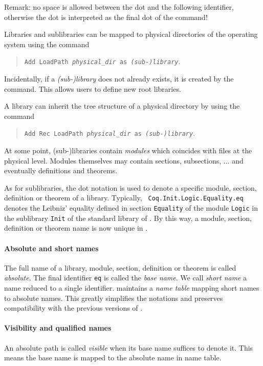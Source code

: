 \documentclass[11pt]{article}
\begin{document}
\smallskip
Remark: no space is allowed
between the dot and the following identifier, otherwise the dot is
interpreted as the final dot of the command!
\smallskip

Libraries and sublibraries can be mapped to physical directories of the
operating system using the command

\begin{quote}
{\tt Add LoadPath {\it physical\_dir} as {\it (sub-)library}}.
\end{quote}

Incidentally, if a {\it (sub-)library} does not already
exists, it is created by the command. This allows users to define new
root libraries.

A library can inherit the tree structure of a physical directory by
using the command

\begin{quote}
{\tt Add Rec LoadPath {\it physical\_dir} as {\it (sub-)library}}.
\end{quote}

At some point, (sub-)libraries contain {\it modules} which coincides
with files at the physical level. Modules themselves may contain
sections, subsections, ... and eventually definitions and theorems.

As for sublibraries, the dot notation is used to denote a specific
module, section, definition or theorem of a library. Typically, {\tt
Coq.Init.Logic.Equality.eq} denotes the Leibniz' equality defined in
section {\tt Equality} of the module {\tt Logic} in the
sublibrary {\tt Init} of the standard library of \Coq. By
this way, a module, section, definition or theorem name is now unique
in \Coq.

\paragraph{Absolute and short names}

The full name of a library, module, section, definition or theorem is
called {\it absolute}. The final identifier {\tt eq} is called the
{\it base name}. We call {\it short name} a name reduced to a single
identifier.  {\Coq} maintains a {\it name table} mapping short names
to absolute names. This greatly simplifies the notations and preserves
compatibility with the previous versions of \Coq.

\paragraph{Visibility and qualified names}
An absolute path is called {\it visible} when its base name suffices
to denote it. This means the base name is mapped to the absolute name
in {\Coq} name table.
\end{document}
